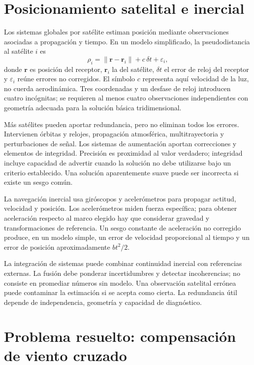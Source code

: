 \section{Posicionamiento satelital e inercial}
Los sistemas globales por satélite estiman posición mediante observaciones asociadas a propagación y tiempo. En un modelo simplificado, la pseudodistancia al satélite $i$ es
\begin{equation}\label{eq:14-gnss}
\rho_i=\|\boldsymbol r-\boldsymbol r_i\|+c\,\delta t+\varepsilon_i,
\end{equation}
donde $\boldsymbol r$ es posición del receptor, $\boldsymbol r_i$ la del satélite, $\delta t$ el error de reloj del receptor y $\varepsilon_i$ reúne errores no corregidos. El símbolo $c$ representa aquí velocidad de la luz, no cuerda aerodinámica. Tres coordenadas y un desfase de reloj introducen cuatro incógnitas; se requieren al menos cuatro observaciones independientes con geometría adecuada para la solución básica tridimensional.

Más satélites pueden aportar redundancia, pero no eliminan todos los errores. Intervienen órbitas y relojes, propagación atmosférica, multitrayectoria y perturbaciones de señal. Los sistemas de aumentación aportan correcciones y elementos de integridad. Precisión es proximidad al valor verdadero; integridad incluye capacidad de advertir cuando la solución no debe utilizarse bajo un criterio establecido. Una solución aparentemente suave puede ser incorrecta si existe un sesgo común.

La navegación inercial usa giróscopos y acelerómetros para propagar actitud, velocidad y posición. Los acelerómetros miden fuerza específica; para obtener aceleración respecto al marco elegido hay que considerar gravedad y transformaciones de referencia. Un sesgo constante de aceleración no corregido produce, en un modelo simple, un error de velocidad proporcional al tiempo y un error de posición aproximadamente $bt^2/2$.

La integración de sistemas puede combinar continuidad inercial con referencias externas. La fusión debe ponderar incertidumbres y detectar incoherencias; no consiste en promediar números sin modelo. Una observación satelital errónea puede contaminar la estimación si se acepta como cierta. La redundancia útil depende de independencia, geometría y capacidad de diagnóstico.

\section{Problema resuelto: compensación de viento cruzado}
